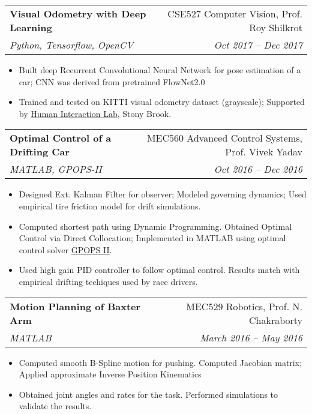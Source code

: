 \documentclass[letterpaper,10pt]{article}
\makeatletter
\newcommand{\resumeHeading}[4]{
  \vspace{-1pt}
    \begin{tabular*}{0.97\textwidth}{l@{\extracolsep{\fill}}r}
      \textbf{#1} & #2 \vspace{-2pt}\\ \vspace{1pt}
      \textit{\small#3} & \textit{\small #4} \\
    \end{tabular*}
}
\newcommand{\resumeItemListStart}{
\vspace{-7pt}
\begin{itemize}[leftmargin=14pt]
}
\newcommand{\resumeItemListEnd}{
\vspace{+7pt}
\end{itemize}
}
\newcommand{\resumeItem}[1]{
  \item\small{
      {#1 \vspace{-7pt}
      }
  }
}
\makeatother
\begin{document}

    \resumeHeading{Visual Odometry with Deep Learning}{CSE527 Computer Vision, Prof. Roy Shilkrot} {Python, Tensorflow, OpenCV}{Oct 2017 -- Dec 2017}
    \resumeItemListStart
      \resumeItem{Built deep Recurrent Convolutional Neural Network for pose estimation of a car; CNN was derived from pretrained FlowNet2.0}
      \resumeItem{Trained and tested on KITTI visual odometry dataset (grayscale); Supported by \href{http://hi.cs.stonybrook.edu/}{Human Interaction Lab}, Stony Brook.}
    \resumeItemListEnd


    \resumeHeading{Optimal Control of a Drifting Car}{MEC560 Advanced Control Systems, Prof. Vivek Yadav}{MATLAB, GPOPS-II}{Oct 2016 -- Dec 2016}
    \resumeItemListStart
      \resumeItem{Designed Ext. Kalman Filter for observer; Modeled governing dynamics; Used empirical tire friction model for drift simulations.}
      \resumeItem{Computed shortest path using Dynamic Programming. Obtained Optimal Control via Direct Collocation; Implemented in MATLAB using optimal control solver \href{http://www.gpops2.com/}{GPOPS II}.}
      \resumeItem{Used high gain PID controller to follow optimal control. Results match with empirical drifting techiques used by race drivers.}
    \resumeItemListEnd

    \resumeHeading{Motion Planning of Baxter Arm}{MEC529 Robotics, Prof. N. Chakraborty}{MATLAB}{March 2016 -- May 2016}
    \resumeItemListStart
      \resumeItem{Computed smooth B-Spline motion for pushing. Computed Jacobian matrix; Applied approximate Inverse Position Kinematics}
      \resumeItem{Obtained joint angles and rates for the task. Performed simulations to validate the results.}
    \resumeItemListEnd
\end{document}

